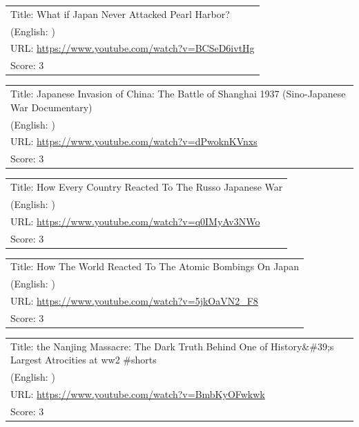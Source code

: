 \documentclass{article}
\begin{document}
\noindent
\begin{tabular}{p{}}
Title: What if Japan Never Attacked Pearl Harbor? \\
(English: ) \\
URL: \url{https://www.youtube.com/watch?v=BCSeD6ivtHg} \\
Score: 3 \\
\end{tabular}
\vspace{0.5em}

\noindent
\begin{tabular}{p{}}
Title: Japanese Invasion of China: The Battle of Shanghai 1937 (Sino-Japanese War Documentary) \\
(English: ) \\
URL: \url{https://www.youtube.com/watch?v=dPwoknKVnxs} \\
Score: 3 \\
\end{tabular}
\vspace{0.5em}

\noindent
\begin{tabular}{p{}}
Title: How Every Country Reacted To The Russo Japanese War \\
(English: ) \\
URL: \url{https://www.youtube.com/watch?v=q0IMyAv3NWo} \\
Score: 3 \\
\end{tabular}
\vspace{0.5em}

\noindent
\begin{tabular}{p{}}
Title: How The World Reacted To The Atomic Bombings On Japan \\
(English: ) \\
URL: \url{https://www.youtube.com/watch?v=5jkOaVN2_F8} \\
Score: 3 \\
\end{tabular}
\vspace{0.5em}

\noindent
\begin{tabular}{p{}}
Title: the Nanjing Massacre: The Dark Truth Behind One of History\&\#39;s Largest Atrocities at ww2 \#shorts \\
(English: ) \\
URL: \url{https://www.youtube.com/watch?v=BmbKyOFwkwk} \\
Score: 3 \\
\end{tabular}
\vspace{0.5em}
\end{document}
